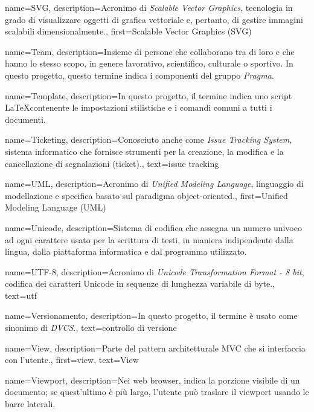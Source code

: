 {
name={SVG},
description={Acronimo di \textit{Scalable Vector Graphics}, tecnologia in grado di visualizzare oggetti di grafica vettoriale e, pertanto, di gestire immagini scalabili dimensionalmente.},
first={Scalable Vector Graphics (SVG)}
}

{
name={Team},
description={Insieme di persone che collaborano tra di loro e che hanno lo stesso scopo, in genere lavorativo, scientifico, culturale o sportivo. In questo progetto, questo termine indica i componenti del gruppo \textit{Pragma}.}
}

{
name={Template},
description={In questo progetto, il termine indica uno script \LaTeX contenente le impostazioni stilistiche e i comandi comuni a tutti i documenti.}
}

{
name={Ticketing},
description={Conosciuto anche come \textit{Issue Tracking System}, sistema informatico che fornisce strumenti per la creazione, la modifica e la cancellazione di segnalazioni (ticket).},
text={issue tracking}
}

{
name={UML},
description={Acronimo di \textit{Unified Modeling Language}, linguaggio di modellazione e specifica basato sul paradigma object-oriented.},
first={Unified Modeling Language (UML)}
}

{
name={Unicode},
description={Sistema di codifica che assegna un numero univoco ad ogni carattere usato per la scrittura di testi, in maniera indipendente dalla lingua, dalla piattaforma informatica e dal programma utilizzato.}
}

{
name={UTF-8},
description={Acronimo di \textit{Unicode Transformation Format - 8 bit}, codifica dei caratteri Unicode in sequenze di lunghezza variabile di byte.},
text={utf}
}

{
name={Versionamento},
description={In questo progetto, il termine è usato come sinonimo di \textit{DVCS}.},
text={controllo di versione}
}

{
name={View},
description={Parte del pattern architetturale MVC che si interfaccia con l'utente.},
first={view},
text={View}
}

{
name={Viewport},
description={Nei web browser, indica la porzione visibile di un documento; se quest'ultimo è più largo, l'utente può traslare il viewport usando le barre laterali.}
}

